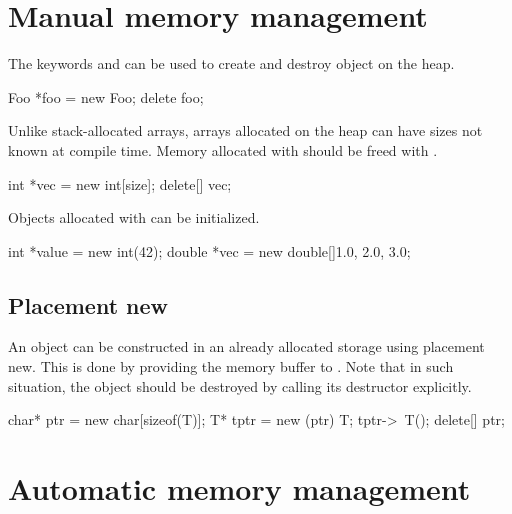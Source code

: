 \documentclass[10pt,landscape,a4paper]{article}
\begin{document}

\small
\begin{multicols*}{3}

\section*{Manual memory management}

The keywords  and 
 can be used 
to create and destroy object on the heap.

\begin{codeblock}
Foo *foo = new Foo;
delete foo;
\end{codeblock}

Unlike stack-allocated arrays, arrays allocated on the heap can have sizes not known 
at compile time. Memory allocated with  should be freed with .

\begin{codeblock}
int *vec = new int[size];
delete[] vec;
\end{codeblock}


Objects allocated with  can be initialized.

\begin{codeblock}
int *value = new int(42);
double *vec = new double[]{1.0, 2.0, 3.0};
\end{codeblock}

\subsection*{Placement new}

An object can be constructed in an already allocated storage using placement new.
This is done by providing the memory buffer to . 
Note that in such situation, the object should be destroyed by calling its destructor 
explicitly. 

\begin{codeblock}
char* ptr = new char[sizeof(T)];
T* tptr = new (ptr) T;
tptr->~T();
delete[] ptr;
\end{codeblock}

\section*{Automatic memory management}


\end{multicols*}
\end{document}
